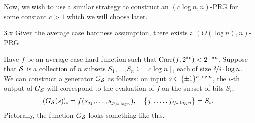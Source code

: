 \documentclass[11pt]{article}
\begin{document}
Now, we wish to use a similar strategy to construct an $(c \log n, n)$-PRG for some constant $c > 1$ which we will choose later. 
\begin{theorem}{3.x}
    Given the average case hardness assumption, there exists a $(O(\log n), n)$-PRG.
\end{theorem}
\noindent
Have $f$ be an average case hard function such that $\mathrm{Corr}(f, 2^{\delta n}) < 2^{-\delta n}$. Suppose that $\mathcal{S}$ is a collection of $n$ subsets $S_1, \ldots, S_n \subseteq [c \log n]$, each of size $\sfrac{2}{\delta} \cdot \log n$. We can construct a generator $G_{\mathcal{S}}$ as follows: on input $s \in \{\pm 1\}^{c \cdot \log n}$, the $i$-th output of $G_{\mathcal{S}}$ will correspond to the evaluation of $f$ on the subset of bits $S_i$,
\begin{equation*}
    (G_{\mathcal{S}}(s))_{i} = f(s_{j_1}, \ldots, s_{j_{\sfrac{2}{\delta} \cdot \log n}}), \quad \left\{j_1, \ldots, j_{\sfrac{2}{\delta} \cdot \log n}\right\} = S_i.
\end{equation*}
Pictorally, the function $G_{\mathcal{S}}$ looks something like this.
\end{document}
